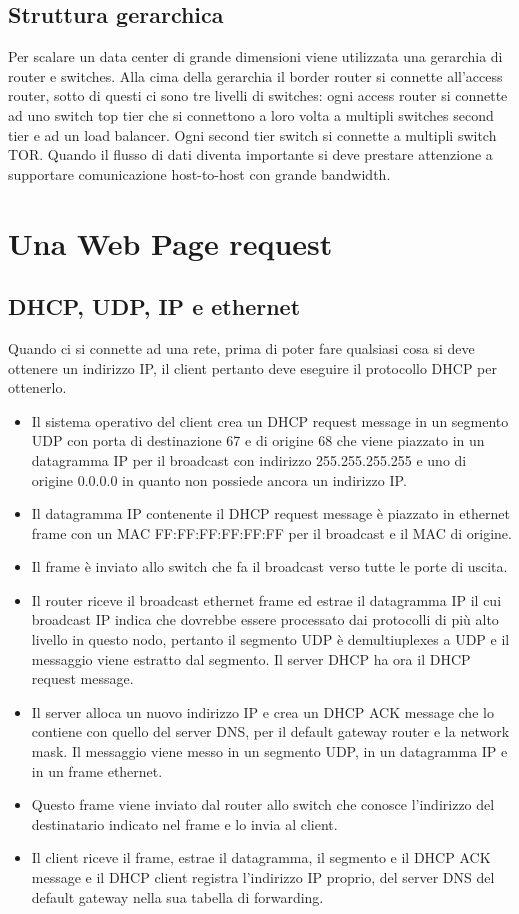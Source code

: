 \subsection{Struttura gerarchica}
Per scalare un data center di grande dimensioni viene utilizzata una gerarchia di router e switches. Alla cima della gerarchia il border router si connette all'access router, sotto di questi ci sono tre livelli di 
switches: ogni access router si connette ad uno switch top tier che si connettono a loro volta a multipli switches second tier e ad un load balancer. Ogni second tier switch si connette a multipli switch TOR. 
Quando il flusso di dati diventa importante si deve prestare attenzione a supportare comunicazione host-to-host con grande bandwidth. 
\section{Una Web Page request}
\subsection{DHCP, UDP, IP e ethernet}
Quando ci si connette ad una rete, prima di poter fare qualsiasi cosa si deve ottenere un indirizzo IP, il client pertanto deve eseguire il protocollo DHCP per ottenerlo.
\begin{itemize}
\item Il sistema operativo del client crea un DHCP request message in un segmento UDP con porta di destinazione 67 e di origine 68 che viene piazzato in un datagramma IP per il broadcast con indirizzo 
255.255.255.255 e uno di origine 0.0.0.0 in quanto non possiede ancora un indirizzo IP.
\item Il datagramma IP contenente il DHCP request message \`e piazzato in ethernet frame con un MAC FF:FF:FF:FF:FF:FF per il broadcast e il MAC di origine. 
\item Il frame \`e inviato allo switch che fa il broadcast verso tutte le porte di uscita. 
\item Il router riceve il broadcast ethernet frame ed estrae il datagramma IP il cui broadcast IP indica che dovrebbe essere processato dai protocolli di pi\`u alto livello in questo nodo, pertanto il segmento UDP
\`e demultiuplexes a UDP e il messaggio viene estratto dal segmento. Il server DHCP ha ora il DHCP request message.
\item Il server alloca un nuovo indirizzo IP e crea un DHCP ACK message che lo contiene con quello del server DNS, per il default gateway router e la network mask. Il messaggio viene messo in un segmento 
UDP, in un datagramma IP e in un frame ethernet. 
\item Questo frame viene inviato dal router allo switch che conosce l'indirizzo del destinatario indicato nel frame e lo invia al client.
\item Il client riceve il frame, estrae il datagramma, il segmento e il DHCP ACK message e il DHCP client registra l'indirizzo IP proprio, del server DNS del default gateway nella sua tabella di forwarding. 
\end{itemize}
